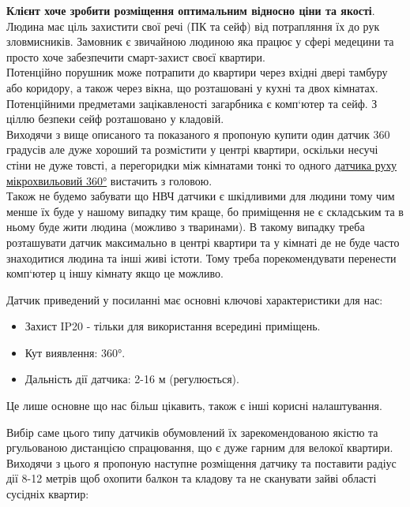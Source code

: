 \textbf{Клієнт хоче зробити розміщення оптимальним відносно ціни та якості}. Людина має ціль захистити свої речі (ПК та сейф) від потрапляння їх до рук зловмисників. Замовник є звичайною людиною яка працює у сфері медецини та просто хоче забезпечити смарт-захист своєї квартири.\\

Потенційно порушник може потрапити до квартири через вхідні двері тамбуру або коридору, а також через вікна, що розташовані у кухні та двох кімнатах.\\

Потенційними предметами зацікавленості загарбника є комп`ютер та сейф. З ціллю безпеки сейф розташовано у кладовій.\\

Виходячи з вище описаного та показаного я пропоную купити один датчик 360 градусів але дуже хороший та розмістити у центрі квартири, оскільки несучі стіни не дуже товсті, а перегоридки між кімнатами тонкі то одного \href{https://www.svit-lamp.ua/datchik-rukhu-mikrokhvilovij-360-230v-bilij/?srsltid=AfmBOorw4jHdgdEdof7Mnl2rhz5X9qELiKz2BF_z3zYOYPQeU4Vz-uxE}{датчика руху мікрохвильовий 360°} вистачить з головою. \\

Також не будемо забувати що НВЧ датчики є шкідливими для людини тому чим менше їх буде у нашому випадку тим краще, бо приміщення не є складським та в ньому буде жити людина (можливо з тваринами). В такому випадку треба розташувати датчик максимально в центрі квартири та у кімнаті де не буде часто знаходитися людина та інші живі істоти. Тому треба порекомендувати перенести комп`ютер ц іншу кімнату якщо це можливо.

\newpage
Датчик приведений у посиланні має основні ключові характеристики для нас:
\begin{itemize}
  \item Захист IP20 - тільки для використання всередині приміщень.
  \item Кут виявлення: 360°.
  \item Дальність дії датчика: 2-16 м (регулюється).
\end{itemize}

Це лише основне що нас більш цікавить, також є інші корисні налаштування.

Вибір саме цього типу датчиків обумовлений їх зарекомендованою якістю та ргульованою дистанцією спрацювання, що є дуже гарним для велокої квартири. Виходячи з цього я пропоную наступне розміщення датчику та поставити радіус дії 8-12 метрів щоб охопити балкон та кладову та не сканувати зайві області сусідніх квартир:

